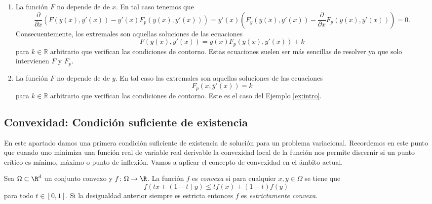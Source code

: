 \documentclass{article}
\begin{document}
\begin{enumerate}
\item La función $F$ no depende de de $x$. En tal caso tenemos que
  \[\frac{\partial}{\partial x} \left(F(\overline{y}(x), \overline{y}'(x)) - \overline{y}'(x)
      F_p(\overline{y}(x), \overline{y}'(x))\right) = \overline{y}'(x) \left(F_y(\overline{y}(x),
      \overline{y}'(x)) - \frac{\partial}{\partial x} F_p(\overline{y}(x), \overline{y}'(x))\right)
    = 0.\] Consecuentemente, los extremales son aquellas soluciones de las ecuaciones
  \begin{equation}
    \label{eq:el:x}
    F(\overline{y}(x), \overline{y}'(x)) = \overline{y}(x) F_p(\overline{y}(x), \overline{y}'(x)) + k
  \end{equation}
  para $k \in \mathbb{R}$ arbitrario que verifican las condiciones de contorno. Estas ecuaciones
  suelen ser más sencillas de resolver ya que solo intervienen $F$ y $F_p$.
\item La función $F$ no depende de de $y$. En tal caso las extremales son aquellas soluciones de las
  ecuaciones
  \begin{equation}
    \label{eq:el:y}
    F_p(x, \overline{y}'(x)) = k
  \end{equation}
  para $k \in \mathbb{R}$ arbitrario que verifican las condiciones de contorno. Este es el caso del
  Ejemplo \ref{ex:intro}.
\end{enumerate}

\subsection{Convexidad: Condición suficiente de existencia}

En este apartado damos una primera condición suficiente de existencia de solución para un problema
variacional. Recordemos en este punto que cuando uno minimiza una función real de variable real
derivable la convexidad local de la función nos permite discernir si un punto crítico es mínimo,
máximo o punto de inflexión. Vamos a aplicar el concepto de convexidad en el ámbito actual.

\begin{definition}
  Sea $\Omega \subset \R^d$ un conjunto convexo y $f \colon \Omega \to \R$. La función $f$ es
  \emph{convexa} si para cualquier $x,y \in \Omega$ se tiene que
  \[ f(tx + (1-t)y) \le tf(x) + (1-t)f(y) \] para todo $t \in [0,1]$. Si la desigualdad anterior
  siempre es estricta entonces $f$ es \emph{estrictamente convexa}.
\end{definition}
\end{document}
